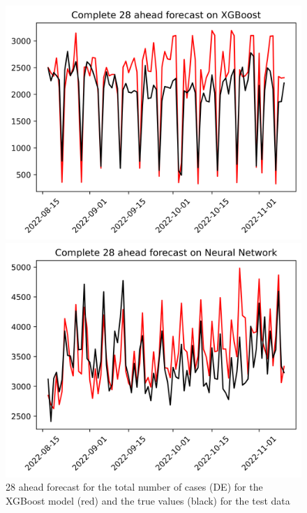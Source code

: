 \begin{figure}

\begin{minipage}{.32\textwidth}
  \centering
  \includegraphics[width=\linewidth]{pics/28_ah/DE_Complete_28_ahead_XGBoost.png}
  \caption{28 ahead forecast for the total number of cases (DE) for the XGBoost model (red) and the true values (black) for the test data}
  \label{fig:tot_cases_fc_28_xgb_DE}
\end{minipage}
\begin{minipage}{.32\textwidth}
  \centering
  \includegraphics[width=\linewidth]{pics/28_ah/Complete_28_ahead_Neural Network.png}

\end{minipage}
\end{figure}
